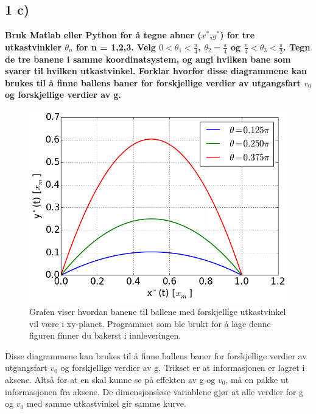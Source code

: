 %
%
%


\pagebreak
\subsection*{1 c)}

\textbf{Bruk Matlab eller Python for å tegne abner ($x^*$,$y^*$) for tre
utkastvinkler $\theta_n$ for n = 1,2,3. Velg $0<\theta_1 < \frac{\pi}{4}$,
$\theta_2 = \frac{\pi}{4}$ og $\frac{\pi}{4} < \theta_3 < \frac{\pi}{2}$.
Tegn de tre banene i samme koordinatsystem, og angi hvilken bane som svarer
til hvilken utkastvinkel. Forklar hvorfor disse diagrammene kan brukes til
å finne ballens baner for forskjellige verdier av utgangsfart $v_0$ og
forskjellige verdier av g.}


\begin{figure}[H]
		\centering
		\includegraphics[width=0.7\linewidth]{../1a.png}
		\caption{Grafen viser hvordan banene til ballene med forskjellige
        utkastvinkel vil være i xy-planet. Programmet som ble brukt for
        å lage denne figuren finner du bakerst i innleveringen.}
		\label{fig_a1}
\end{figure}

Disse diagrammene kan brukes til å finne ballens baner for forskjellige verdier
av utgangsfart $v_0$ og forskjellige verdier av g. Trikset er at informasjonen
er lagret i aksene. Altså for at en skal kunne se på effekten av g og $v_0$, må en
pakke ut informasjonen fra aksene. De dimensjonsløse variablene gjør at
alle verdier for g og $v_0$ med samme utkastvinkel gir samme kurve.
